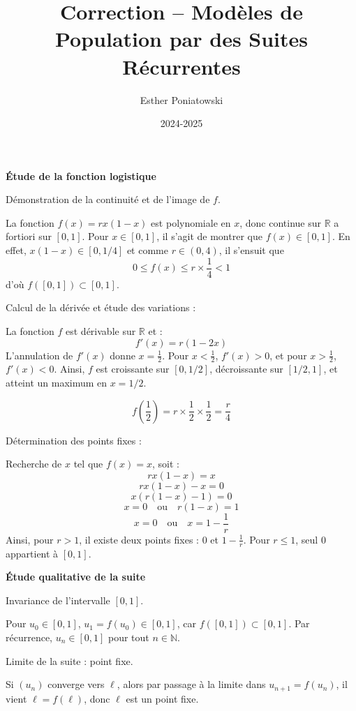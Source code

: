 \documentclass[10pt,a4paper]{article}
\title{Correction -- Modèles de Population par des Suites Récurrentes}
\author{Esther Poniatowski}
\date{2024-2025}
\begin{document}
\bigskip
\textbf{Étude de la fonction logistique}

\q Démonstration de la continuité et de l'image de \( f \).

La fonction \( f(x) = r x (1 - x) \) est polynomiale en \( x \), donc continue sur \( \mathbb{R} \)
a fortiori sur \( [0,1] \). Pour \( x \in [0,1] \), il s'agit de montrer que \( f(x) \in [0,1] \).
En effet, \( x(1 - x) \in [0,1/4] \) et comme \( r \in (0,4) \), il s'ensuit que
\[
0 \leq f(x) \leq r \times \frac{1}{4} < 1
\]
d'où \( f([0,1]) \subset [0,1] \).


\q Calcul de la dérivée et étude des variations :

La fonction \( f \) est dérivable sur \( \mathbb{R} \) et :
\[
f'(x) = r (1 - 2x)
\]
L'annulation de \( f'(x) \) donne \( x = \frac{1}{2} \). Pour \( x < \frac{1}{2} \), \( f'(x) > 0
\), et pour \( x > \frac{1}{2} \), \( f'(x) < 0 \). Ainsi, \( f \) est croissante sur \( [0,1/2] \),
décroissante sur \( [1/2, 1] \), et atteint un maximum en \( x = 1/2 \).

\[
f\left( \frac{1}{2} \right) = r \times \frac{1}{2} \times \frac{1}{2} = \frac{r}{4}
\]


\q Détermination des points fixes :

Recherche de \( x \) tel que \( f(x) = x \), soit :
\[
r x (1 - x) = x
\]
\[
r x (1 - x) - x = 0
\]
\[
x (r (1 - x) - 1) = 0
\]
\[
x = 0 \quad \text{ou} \quad r (1 - x) = 1
\]
\[
x = 0 \quad \text{ou} \quad x = 1 - \frac{1}{r}
\]
Ainsi, pour \( r > 1 \), il existe deux points fixes : \( 0 \) et \( 1 - \frac{1}{r} \). Pour \( r
\leq 1 \), seul \( 0 \) appartient à \( [0,1] \).


\bigskip
\textbf{Étude qualitative de la suite}

\q Invariance de l'intervalle \( [0,1] \).

Pour \( u_0 \in [0,1] \), \( u_1 = f(u_0) \in [0,1] \), car \( f([0,1]) \subset [0,1] \). Par
récurrence, \( u_n \in [0,1] \) pour tout \( n \in \mathbb{N} \).


\q Limite de la suite : point fixe.

Si \( (u_n) \) converge vers \( \ell \), alors par passage à la limite dans \( u_{n+1} = f(u_n) \),
il vient \( \ell = f(\ell) \), donc \( \ell \) est un point fixe.

\end{document}
